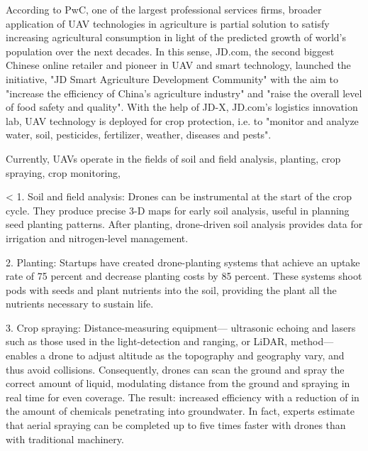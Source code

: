 According to PwC, one of the largest professional services firms,
broader application of UAV technologies in agriculture 
is partial solution to satisfy 
increasing agricultural consumption
in light of the predicted growth of world's population
over the next decades.
In this sense, JD.com,
the second biggest Chinese online retailer
and pioneer in UAV and smart technology,
launched the initiative,
"JD Smart Agriculture Development Community"
with the aim to
"increase the efficiency of China’s agriculture industry" and
"raise the overall level of food safety and quality".
With the help of 
JD-X, JD.com’s logistics innovation lab,
UAV technology is deployed for
crop protection, i.e. to 
"monitor and analyze water, soil, pesticides, fertilizer, weather, diseases and pests".




Currently, UAVs operate in
the fields of
soil and field analysis,
planting,
crop spraying,
crop monitoring,




<
1. Soil and field analysis: 
Drones can be instrumental at the start of the crop cycle. 
They produce precise 3-D maps for early soil analysis, 
useful in planning seed planting patterns. 
After planting, drone-driven soil analysis provides data for 
irrigation and nitrogen-level management.

2. Planting: 
Startups have created drone-planting systems 
that achieve an uptake rate of 75 percent and 
decrease planting costs by 85 percent. 
These systems shoot pods with seeds and 
plant nutrients into the soil, 
providing the plant all the nutrients 
necessary to sustain life.

3. Crop spraying: 
Distance-measuring equipment—
ultrasonic echoing and 
lasers such as those used in the light-detection and ranging, 
or LiDAR, method—
enables a drone to adjust altitude 
as the topography and geography vary, and 
thus avoid collisions. 
Consequently, drones can scan the ground and 
spray the correct amount of liquid, 
modulating distance from the ground and 
spraying in real time for even coverage. 
The result: increased efficiency 
with a reduction of in the amount of chemicals 
penetrating into groundwater. 
In fact, experts estimate that aerial spraying 
can be completed up to five times faster with drones 
than with traditional machinery.

